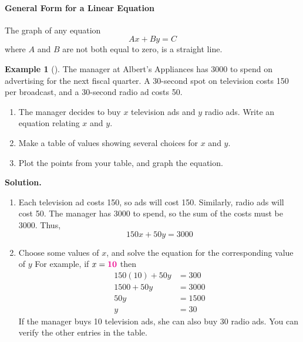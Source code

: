 \documentclass[10pt,]{book}
\theoremstyle{plain}
\theoremstyle{definition}
\theoremstyle{definition}
\newtheorem{example}[theorem]{Example}
\numberwithin{equation}{section}
\newcommand{\alert}[1]{\mathbf{\color{magenta}{#1}}}
\newcommand{\amp}{ & }
\begin{document}
\paragraph[General Form for a Linear Equation]{General Form for a Linear Equation}\label{paragraphs-2}
The graph of any equation \begin{equation*}Ax+By=C\end{equation*} where \(A\) and \(B\) are not both equal to zero, is a straight line.%
\begin{example}[]\label{example-advertising}
The manager at Albert's Appliances has \textdollar{}3000 to spend on advertising for the next fiscal quarter.  A 30-second spot on television costs \textdollar{}150 per broadcast, and a 30-second radio ad costs \textdollar{}50.%
\leavevmode%
\begin{enumerate}[label=*\alph**]
\item\hypertarget{li-44}{}The manager decides to buy \(x\) television ads and \(y\) radio ads.  Write an equation relating \(x\) and \(y\).%
\item\hypertarget{li-45}{}Make a table of values showing several choices for \(x\) and \(y\).%
\item\hypertarget{li-46}{}Plot the points from your table, and graph the equation.%
\end{enumerate}
\par\medskip\noindent%
\textbf{Solution.}\quad \leavevmode%
\begin{enumerate}[label=*\alph**]
\item\hypertarget{li-47}{}Each television ad costs \textdollar{}150, so ads will cost \textdollar{}150.  Similarly, radio ads will cost \textdollar{}50.  The manager has \textdollar{}3000 to spend, so the sum of the costs must be \textdollar{}3000.  Thus, \begin{equation*}150x+50y=3000\end{equation*}%
\item\hypertarget{li-48}{}Choose some values of \(x\), and solve the equation for the corresponding value of \(y\)  For example, if \(x=\alert{10}\) then
               \begin{align*}
150(10)+50y\amp=300\\
1500+50y\amp=3000\\
50y\amp=1500\\
y\amp=30
\end{align*}
                If the manager buys 10 television ads, she can also buy 30 radio ads.  You can verify the other entries in the table.%

\end{enumerate}
\end{example}
\end{document}
